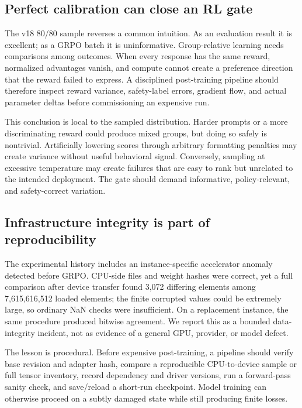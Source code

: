\documentclass[11pt]{article}
\begin{document}
\subsection{Perfect calibration can close an RL gate}

The v18 80/80 sample reverses a common intuition. As an evaluation result it is excellent; as a GRPO batch it is uninformative. Group-relative learning needs comparisons among outcomes. When every response has the same reward, normalized advantages vanish, and compute cannot create a preference direction that the reward failed to express. A disciplined post-training pipeline should therefore inspect reward variance, safety-label errors, gradient flow, and actual parameter deltas before commissioning an expensive run.

This conclusion is local to the sampled distribution. Harder prompts or a more discriminating reward could produce mixed groups, but doing so safely is nontrivial. Artificially lowering scores through arbitrary formatting penalties may create variance without useful behavioral signal. Conversely, sampling at excessive temperature may create failures that are easy to rank but unrelated to the intended deployment. The gate should demand informative, policy-relevant, and safety-correct variation.

\subsection{Infrastructure integrity is part of reproducibility}

The experimental history includes an instance-specific accelerator anomaly detected before GRPO. CPU-side files and weight hashes were correct, yet a full comparison after device transfer found 3,072 differing elements among 7,615,616,512 loaded elements; the finite corrupted values could be extremely large, so ordinary NaN checks were insufficient. On a replacement instance, the same procedure produced bitwise agreement. We report this as a bounded data-integrity incident, not as evidence of a general GPU, provider, or model defect.

The lesson is procedural. Before expensive post-training, a pipeline should verify base revision and adapter hash, compare a reproducible CPU-to-device sample or full tensor inventory, record dependency and driver versions, run a forward-pass sanity check, and save/reload a short-run checkpoint. Model training can otherwise proceed on a subtly damaged state while still producing finite losses.
\end{document}
